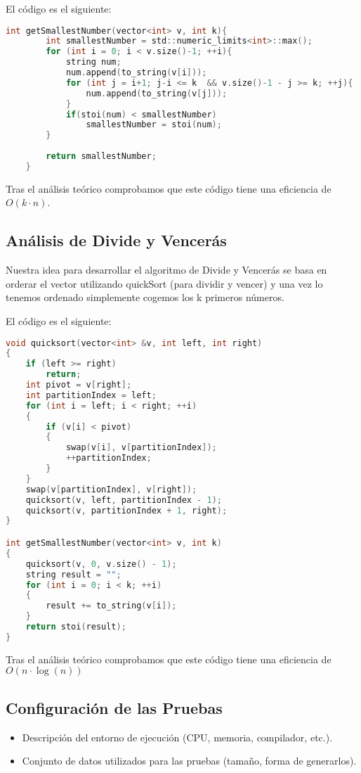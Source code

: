 \documentclass[a4paper,12pt]{article}
\begin{document}
El código es el siguiente:

\begin{lstlisting}[language=C, caption={Brute Force de \textbf{"El número más pequeño"}}]
	int getSmallestNumber(vector<int> v, int k){
		int smallestNumber = std::numeric_limits<int>::max();
		for (int i = 0; i < v.size()-1; ++i){
			string num;
			num.append(to_string(v[i]));
			for (int j = i+1; j-i <= k  && v.size()-1 - j >= k; ++j){
				num.append(to_string(v[j]));
			}
			if(stoi(num) < smallestNumber)
				smallestNumber = stoi(num);   
		}
	
		return smallestNumber;
	}	
	 \end{lstlisting}

Tras el análisis teórico comprobamos que este código tiene una eficiencia de $O(k\cdot n)$.
\subsection{Análisis de Divide y Vencerás}
Nuestra idea para desarrollar el algoritmo de Divide y Vencerás se basa en orderar el vector utilizando quickSort (para dividir y vencer) y una vez lo tenemos ordenado simplemente cogemos los k primeros números.

El código es el siguiente:

\begin{lstlisting}[language=C, caption={Divide y vencerás de \textbf{"El número más pequeño"}}]
void quicksort(vector<int> &v, int left, int right)
{
	if (left >= right)
		return;
	int pivot = v[right];
	int partitionIndex = left;
	for (int i = left; i < right; ++i)
	{
		if (v[i] < pivot)
		{
			swap(v[i], v[partitionIndex]);
			++partitionIndex;
		}
	}
	swap(v[partitionIndex], v[right]);
	quicksort(v, left, partitionIndex - 1);
	quicksort(v, partitionIndex + 1, right);
}

int getSmallestNumber(vector<int> v, int k)
{
	quicksort(v, 0, v.size() - 1);
	string result = "";
	for (int i = 0; i < k; ++i)
	{
		result += to_string(v[i]);
	}
	return stoi(result);
}	
	 \end{lstlisting}

Tras el análisis teórico comprobamos que este código tiene una eficiencia de $O(n\cdot \log (n))$

\subsection{Configuración de las Pruebas}
\begin{itemize}
	\item Descripción del entorno de ejecución (CPU, memoria, compilador, etc.).
	\item Conjunto de datos utilizados para las pruebas (tamaño, forma de generarlos).
\end{itemize}
\end{document}

